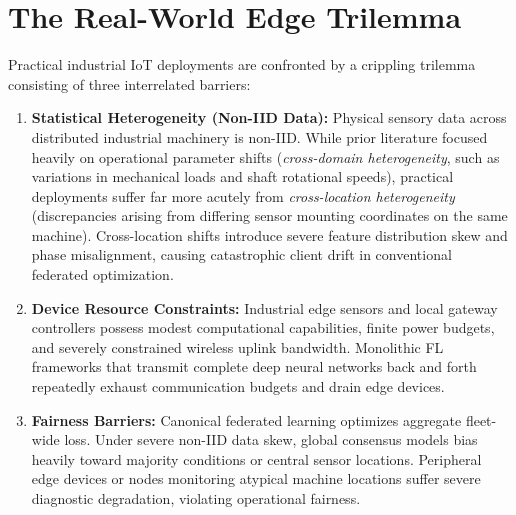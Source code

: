 \documentclass[12pt,a4paper]{report}
\begin{document}
\section{The Real-World Edge Trilemma}
Practical industrial IoT deployments are confronted by a crippling trilemma consisting of three interrelated barriers:
\begin{enumerate}
    \item \textbf{Statistical Heterogeneity (Non-IID Data):} Physical sensory data across distributed industrial machinery is non-IID. While prior literature focused heavily on operational parameter shifts (\textit{cross-domain heterogeneity}, such as variations in mechanical loads and shaft rotational speeds), practical deployments suffer far more acutely from \textit{cross-location heterogeneity} (discrepancies arising from differing sensor mounting coordinates on the same machine). Cross-location shifts introduce severe feature distribution skew and phase misalignment, causing catastrophic client drift in conventional federated optimization.
    \item \textbf{Device Resource Constraints:} Industrial edge sensors and local gateway controllers possess modest computational capabilities, finite power budgets, and severely constrained wireless uplink bandwidth. Monolithic FL frameworks that transmit complete deep neural networks back and forth repeatedly exhaust communication budgets and drain edge devices.
    \item \textbf{Fairness Barriers:} Canonical federated learning optimizes aggregate fleet-wide loss. Under severe non-IID data skew, global consensus models bias heavily toward majority conditions or central sensor locations. Peripheral edge devices or nodes monitoring atypical machine locations suffer severe diagnostic degradation, violating operational fairness.
\end{enumerate}
\end{document}
